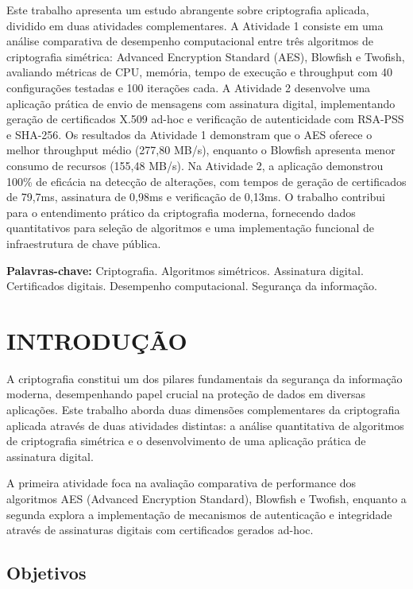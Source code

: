 \documentclass[12pt,a4paper,oneside]{article}
\begin{document}
Este trabalho apresenta um estudo abrangente sobre criptografia aplicada, dividido em duas atividades complementares. A Atividade 1 consiste em uma análise comparativa de desempenho computacional entre três algoritmos de criptografia simétrica: Advanced Encryption Standard (AES), Blowfish e Twofish, avaliando métricas de CPU, memória, tempo de execução e throughput com 40 configurações testadas e 100 iterações cada. A Atividade 2 desenvolve uma aplicação prática de envio de mensagens com assinatura digital, implementando geração de certificados X.509 ad-hoc e verificação de autenticidade com RSA-PSS e SHA-256. Os resultados da Atividade 1 demonstram que o AES oferece o melhor throughput médio (277,80 MB/s), enquanto o Blowfish apresenta menor consumo de recursos (155,48 MB/s). Na Atividade 2, a aplicação demonstrou 100\% de eficácia na detecção de alterações, com tempos de geração de certificados de 79,7ms, assinatura de 0,98ms e verificação de 0,13ms. O trabalho contribui para o entendimento prático da criptografia moderna, fornecendo dados quantitativos para seleção de algoritmos e uma implementação funcional de infraestrutura de chave pública.

\vspace{0.5cm}
\noindent\textbf{Palavras-chave:} Criptografia. Algoritmos simétricos. Assinatura digital. Certificados digitais. Desempenho computacional. Segurança da informação.

\newpage
\tableofcontents

\newpage
\section{INTRODUÇÃO}

A criptografia constitui um dos pilares fundamentais da segurança da informação moderna, desempenhando papel crucial na proteção de dados em diversas aplicações. Este trabalho aborda duas dimensões complementares da criptografia aplicada através de duas atividades distintas: a análise quantitativa de algoritmos de criptografia simétrica e o desenvolvimento de uma aplicação prática de assinatura digital.

A primeira atividade foca na avaliação comparativa de performance dos algoritmos AES (Advanced Encryption Standard), Blowfish e Twofish, enquanto a segunda explora a implementação de mecanismos de autenticação e integridade através de assinaturas digitais com certificados gerados ad-hoc.

\subsection{Objetivos}
\end{document}
